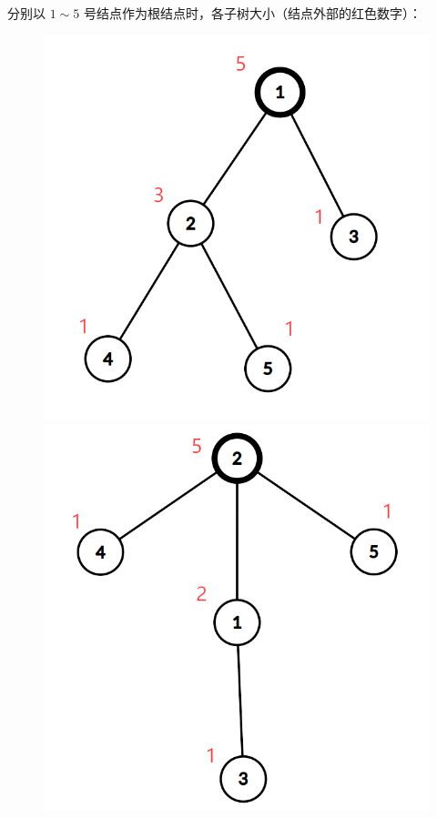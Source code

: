 \documentclass{ctpro}
\begin{document}
分别以 $1 \sim 5$ 号结点作为根结点时，各子树大小（结点外部的红色数字）：
\begin{figure}
	\includegraphics[scale=0.14]{images/D_1.png}
	\includegraphics[scale=0.14]{images/D_2.png}

\end{figure}
\end{document}
